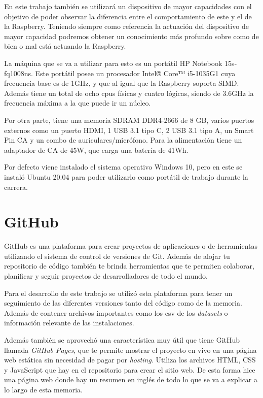 \documentclass[a4paper, 12pt]{book}
\begin{document}
En este trabajo también se utilizará un dispositivo de mayor capacidades con el objetivo de poder observar la diferencia entre el comportamiento de este y el de la Raspberry. Teniendo siempre como referencia la actuación del dispositivo de mayor capacidad podremos obtener un conocimiento más profundo sobre como de bien o mal está actuando la Raspberry. 

La máquina que se va a utilizar para esto es un portátil HP Notebook 15s-fq1008ns. Este portátil posee un procesador Intel® Core™ i5-1035G1 cuya frecuencia base es de 1GHz, y que al igual que la Raspberry soporta SIMD. Además tiene un total de ocho cpus físicas y cuatro lógicas, siendo de 3.6GHz la frecuencia máxima a la que puede ir un núcleo. 

Por otra parte, tiene una memoria SDRAM DDR4-2666 de 8 GB, varios puertos externos como un puerto HDMI, 1 USB 3.1 tipo C, 2 USB 3.1 tipo A, un Smart Pin CA y un combo de auriculares/micrófono. Para la alimentación tiene un adaptador de CA de 45W, que carga una batería de 41Wh. 

Por defecto viene instalado el sistema operativo Windows 10, pero en este se instaló Ubuntu 20.04 para poder utilizarlo como portátil de trabajo durante la carrera. 


\section{GitHub}
\label{sec:github}

GitHub es una plataforma para crear proyectos de aplicaciones o de herramientas utilizando el sistema de control de versiones de Git. Además de alojar tu repositorio de código también te brinda herramientas que te permiten colaborar, planificar y seguir proyectos de desarrolladores de todo el mundo.

Para el desarrollo de este trabajo se utilizó esta plataforma para tener un seguimiento de las diferentes versiones tanto del código como de la memoria. Además de contener archivos importantes como los csv de los \textit{datasets} o información relevante de las instalaciones.

Además también se aprovechó una característica muy útil que tiene GitHub llamada \textit{GitHub Pages}, que te permite mostrar el proyecto en vivo en una página web estática sin necesidad de pagar por \textit{hosting}. Utiliza los archivos HTML, CSS y JavaScript que hay en el repositorio para crear el sitio web. De esta forma hice una página web donde hay un resumen en inglés de todo lo que se va a explicar a lo largo de esta memoria. 
\end{document}
